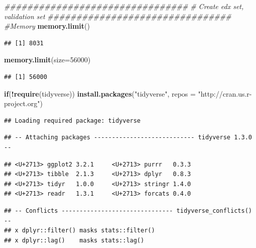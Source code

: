 \documentclass[
]{article}
\newenvironment{Shaded}{\begin{snugshade}}{\end{snugshade}}
\newcommand{\CommentTok}[1]{\textcolor[rgb]{0.56,0.35,0.01}{\textit{#1}}}
\newcommand{\ControlFlowTok}[1]{\textcolor[rgb]{0.13,0.29,0.53}{\textbf{#1}}}
\newcommand{\DataTypeTok}[1]{\textcolor[rgb]{0.13,0.29,0.53}{#1}}
\newcommand{\DecValTok}[1]{\textcolor[rgb]{0.00,0.00,0.81}{#1}}
\newcommand{\KeywordTok}[1]{\textcolor[rgb]{0.13,0.29,0.53}{\textbf{#1}}}
\newcommand{\NormalTok}[1]{#1}
\newcommand{\OperatorTok}[1]{\textcolor[rgb]{0.81,0.36,0.00}{\textbf{#1}}}
\newcommand{\StringTok}[1]{\textcolor[rgb]{0.31,0.60,0.02}{#1}}
\begin{document}
\begin{Shaded}
\begin{Highlighting}[]
\CommentTok{################################}
\CommentTok{# Create edx set, validation set}
\CommentTok{################################}
\CommentTok{#Memory }
\KeywordTok{memory.limit}\NormalTok{()}
\end{Highlighting}
\end{Shaded}

\begin{verbatim}
## [1] 8031
\end{verbatim}

\begin{Shaded}
\begin{Highlighting}[]
\KeywordTok{memory.limit}\NormalTok{(}\DataTypeTok{size=}\DecValTok{56000}\NormalTok{)}
\end{Highlighting}
\end{Shaded}

\begin{verbatim}
## [1] 56000
\end{verbatim}

\begin{Shaded}
\begin{Highlighting}[]
\ControlFlowTok{if}\NormalTok{(}\OperatorTok{!}\KeywordTok{require}\NormalTok{(tidyverse)) }\KeywordTok{install.packages}\NormalTok{(}\StringTok{"tidyverse"}\NormalTok{, }\DataTypeTok{repos =} \StringTok{"http://cran.us.r-project.org"}\NormalTok{)}
\end{Highlighting}
\end{Shaded}

\begin{verbatim}
## Loading required package: tidyverse
\end{verbatim}

\begin{verbatim}
## -- Attaching packages ---------------------------- tidyverse 1.3.0 --
\end{verbatim}

\begin{verbatim}
## <U+2713> ggplot2 3.2.1     <U+2713> purrr   0.3.3
## <U+2713> tibble  2.1.3     <U+2713> dplyr   0.8.3
## <U+2713> tidyr   1.0.0     <U+2713> stringr 1.4.0
## <U+2713> readr   1.3.1     <U+2713> forcats 0.4.0
\end{verbatim}

\begin{verbatim}
## -- Conflicts ------------------------------- tidyverse_conflicts() --
## x dplyr::filter() masks stats::filter()
## x dplyr::lag()    masks stats::lag()
\end{verbatim}
\end{document}

